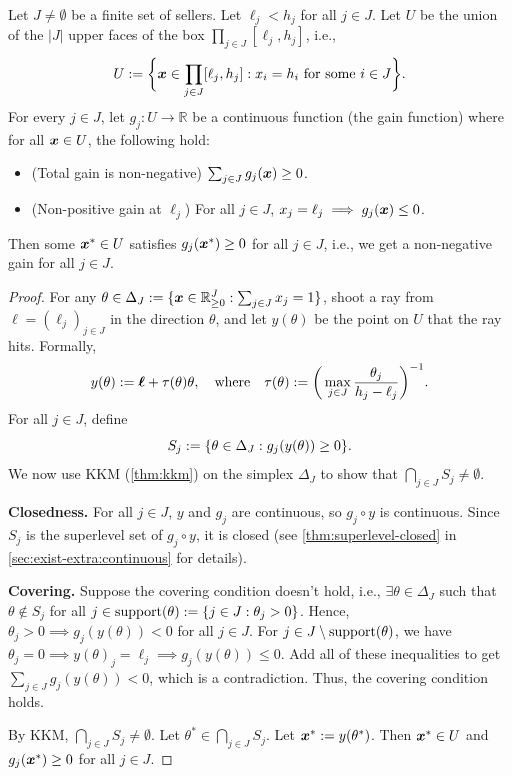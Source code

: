 \begin{lemma}
\label{thm:general-inner-kkm}
Let $J \neq \emptyset$ be a finite set of sellers. Let $\ell_j < h_j$ for all $j \in J$.
Let $U$ be the union of the $|J|$ upper faces of the box $\prod_{j \in J} [\ell_j, h_j]$, i.e.,
\[ U := \bigg\{\bm{x} \in \prod_{j \in J} [\ell_j, h_j]: x_i = h_i \text{ for some } i \in J\bigg\}. \]
For every $j \in J$, let $g_j: U \to \mathbb{R}$ be a continuous function
(the gain function) where for all $\bm{x} \in U$, the following hold:
\begin{itemize}
\item (Total gain is non-negative) $\sum_{j \in J} g_j(\bm{x}) \ge 0$.
\item (Non-positive gain at $\ell_j$) For all $j \in J$, $x_j = \ell_j \implies g_j(\bm{x}) \le 0$.
\end{itemize}
Then some $\bm{x}^* \in U$ satisfies $g_j(\bm{x}^*) \ge 0$ for all $j \in J$,
i.e., we get a non-negative gain for all $j \in J$.
\end{lemma}
\begin{proof}
For any $\theta \in \Delta_J := \{\bm{x} \in \mathbb{R}_{\ge 0}^J: \sum_{j \in J} x_j = 1\}$,
shoot a ray from $\bm{\ell} = (\ell_j)_{j \in J}$ in the direction $\theta$,
and let $y(\theta)$ be the point on $U$ that the ray hits. Formally,
\[ y(\theta) := \bm{\ell} + \tau(\theta)\theta, \quad \text{where} \quad
    \tau(\theta) := \bigg(\max_{j \in J} \frac{\theta_j}{h_j - \ell_j}\bigg)^{-1}. \]
For all $j \in J$, define
\[ S_j := \{\theta \in \Delta_J: g_j(y(\theta)) \ge 0 \}. \]
We now use KKM (\cref{thm:kkm}) on the simplex $\Delta_J$
to show that $\bigcap_{j \in J} S_j \neq \emptyset$.

\textbf{Closedness.}
For all $j \in J$, $y$ and $g_j$ are continuous, so $g_j \circ y$ is continuous.
Since $S_j$ is the superlevel set of $g_j \circ y$, it is closed
(see \cref{thm:superlevel-closed} in \cref{sec:exist-extra:continuous} for details).

\textbf{Covering.}
Suppose the covering condition doesn't hold,
i.e., $\exists \theta \in \Delta_J$ such that $\theta \not\in S_j$
for all $j \in \operatorname{support}(\theta) := \{j \in J: \theta_j > 0\}$.
Hence, $\theta_j > 0 \implies g_j(y(\theta)) < 0$ for all $j \in J$.
For $j \in J \setminus \operatorname{support}(\theta)$, we have
$\theta_j = 0 \implies y(\theta)_j = \ell_j \implies g_j(y(\theta)) \le 0$.
Add all of these inequalities to get $\sum_{j \in J} g_j(y(\theta)) < 0$,
which is a contradiction. Thus, the covering condition holds.

By KKM, $\bigcap_{j \in J} S_j \neq \emptyset$. Let $\theta^* \in \bigcap_{j \in J} S_j$.
Let $\bm{x}^* := y(\theta^*)$. Then $\bm{x}^* \in U$ and $g_j(\bm{x}^*) \ge 0$ for all $j \in J$.
\end{proof}


